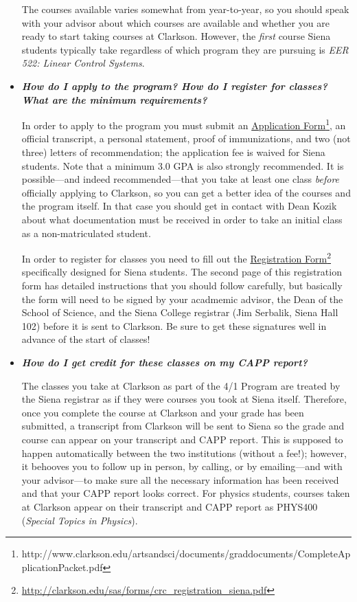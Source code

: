 \documentclass[12pt]{article}
\begin{document}
\begin{itemize}
{The courses available varies somewhat from year-to-year, so you should speak
with your advisor about which courses are available and whether you are ready to
start taking courses at Clarkson.  However, the \emph{first} course Siena
students typically take regardless of which program they are pursuing is {\em
  EER 522: Linear Control Systems}.}

\item{{\bf {\em How do I apply to the program?  How do I register for classes?
      What are the minimum requirements?}}

In order to apply to the program you must submit an \underline{Application
  Form}\footnote{http://www.clarkson.edu/artsandsci/documents/graddocuments/CompleteApplicationPacket.pdf},
an official transcript, a personal statement, proof of immunizations, and two
(not three) letters of recommendation; the application fee is waived for Siena
students.  Note that a minimum 3.0 GPA is also strongly recommended.  It is
possible---and indeed recommended---that you take at least one class
\emph{before} officially applying to Clarkson, so you can get a better idea of
the courses and the program itself.  In that case you should get in contact with
Dean Kozik about what documentation must be received in order to take an initial
class as a non-matriculated student.

In order to register for classes you need to fill out the
\underline{Registration
  Form}\footnote{\url{http://clarkson.edu/sas/forms/crc_registration_siena.pdf}}
specifically designed for Siena students.  The second page of this registration
form has detailed instructions that you should follow carefully, but basically
the form will need to be signed by your acadmemic advisor, the Dean of the
School of Science, and the Siena College registrar (Jim Serbalik, Siena Hall
102) before it is sent to Clarkson.  Be sure to get these signatures well in
advance of the start of classes!}

\item{{\bf {\em How do I get credit for these classes on my CAPP report?}}

The classes you take at Clarkson as part of the 4/1 Program are treated by the
Siena registrar as if they were courses you took at Siena itself.  Therefore,
once you complete the course at Clarkson and your grade has been submitted, a
transcript from Clarkson will be sent to Siena so the grade and course can
appear on your transcript and CAPP report.  This is supposed to happen
automatically between the two institutions (without a fee!); however, it
behooves you to follow up in person, by calling, or by emailing---and with your
advisor---to make sure all the necessary information has been received and that
your CAPP report looks correct.  For physics students, courses taken at Clarkson
appear on their transcript and CAPP report as PHYS400 ({\em Special Topics in
  Physics}).}


\end{itemize}
\end{document}
